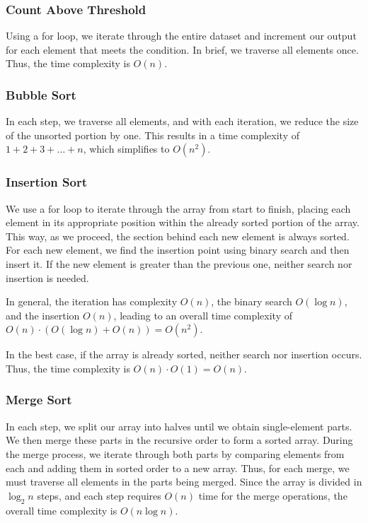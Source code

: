 \subsubsection*{\small Count Above Threshold}

Using a for loop, we iterate through the entire dataset and increment our output for each element that meets the condition. In brief, we traverse all elements once. Thus, the time complexity is \(O(n)\).

\subsubsection*{\small Bubble Sort}

In each step, we traverse all elements, and with each iteration, we reduce the size of the unsorted portion by one. This results in a time complexity of \(1 + 2 + 3 + \dots + n\), which simplifies to \(O(n^2)\).

\subsubsection*{\small Insertion Sort}

We use a for loop to iterate through the array from start to finish, placing each element in its appropriate position within the already sorted portion of the array. This way, as we proceed, the section behind each new element is always sorted. For each new element, we find the insertion point using binary search and then insert it. If the new element is greater than the previous one, neither search nor insertion is needed. 

In general, the iteration has complexity \(O(n)\), the binary search \(O(\log n)\), and the insertion \(O(n)\), leading to an overall time complexity of \(O(n) \cdot (O(\log n) + O(n)) = O(n^2)\).

In the best case, if the array is already sorted, neither search nor insertion occurs. Thus, the time complexity is \(O(n) \cdot O(1) = O(n)\).

\subsubsection*{\small Merge Sort}

In each step, we split our array into halves until we obtain single-element parts. We then merge these parts in the recursive order to form a sorted array. During the merge process, we iterate through both parts by comparing elements from each and adding them in sorted order to a new array. Thus, for each merge, we must traverse all elements in the parts being merged. Since the array is divided in \(\log_2 n\) steps, and each step requires \(O(n)\) time for the merge operations, the overall time complexity is \(O(n \log n)\).

